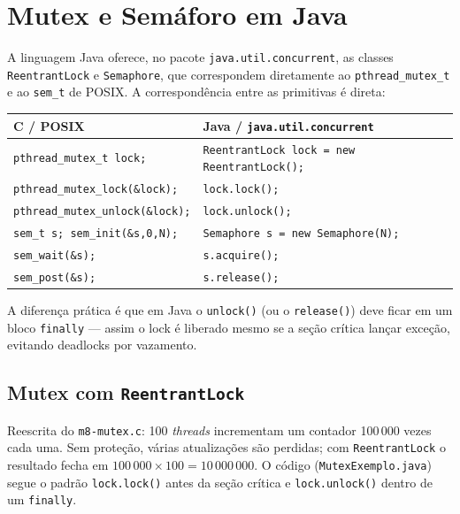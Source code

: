 %

\section{Mutex e Semáforo em Java}

A linguagem Java oferece, no pacote \texttt{java.util.concurrent}, as
classes \texttt{ReentrantLock} e \texttt{Semaphore}, que correspondem
diretamente ao \texttt{pthread\_mutex\_t} e ao \texttt{sem\_t} de POSIX.
A correspondência entre as primitivas é direta:

\begin{center}
\small
\begin{tabular}{ll}
\toprule
\textbf{C / POSIX} & \textbf{Java / \texttt{java.util.concurrent}} \\
\midrule
\texttt{pthread\_mutex\_t lock;}        & \texttt{ReentrantLock lock = new ReentrantLock();} \\
\texttt{pthread\_mutex\_lock(\&lock);}  & \texttt{lock.lock();} \\
\texttt{pthread\_mutex\_unlock(\&lock);}& \texttt{lock.unlock();} \\
\texttt{sem\_t s; sem\_init(\&s,0,N);}  & \texttt{Semaphore s = new Semaphore(N);} \\
\texttt{sem\_wait(\&s);}                & \texttt{s.acquire();} \\
\texttt{sem\_post(\&s);}                & \texttt{s.release();} \\
\bottomrule
\end{tabular}
\end{center}

A diferença prática é que em Java o \texttt{unlock()} (ou o \texttt{release()})
deve ficar em um bloco \texttt{finally} --- assim o lock é liberado mesmo se
a seção crítica lançar exceção, evitando deadlocks por vazamento.

\subsection{Mutex com \texttt{ReentrantLock}}

Reescrita do \texttt{m8-mutex.c}: 100 \textit{threads} incrementam um
contador 100\,000 vezes cada uma. Sem proteção, várias atualizações são
perdidas; com \texttt{ReentrantLock} o resultado fecha em
$100\,000 \times 100 = 10\,000\,000$. O código (\texttt{MutexExemplo.java})
segue o padrão \texttt{lock.lock()} antes da seção crítica e
\texttt{lock.unlock()} dentro de um \texttt{finally}.

